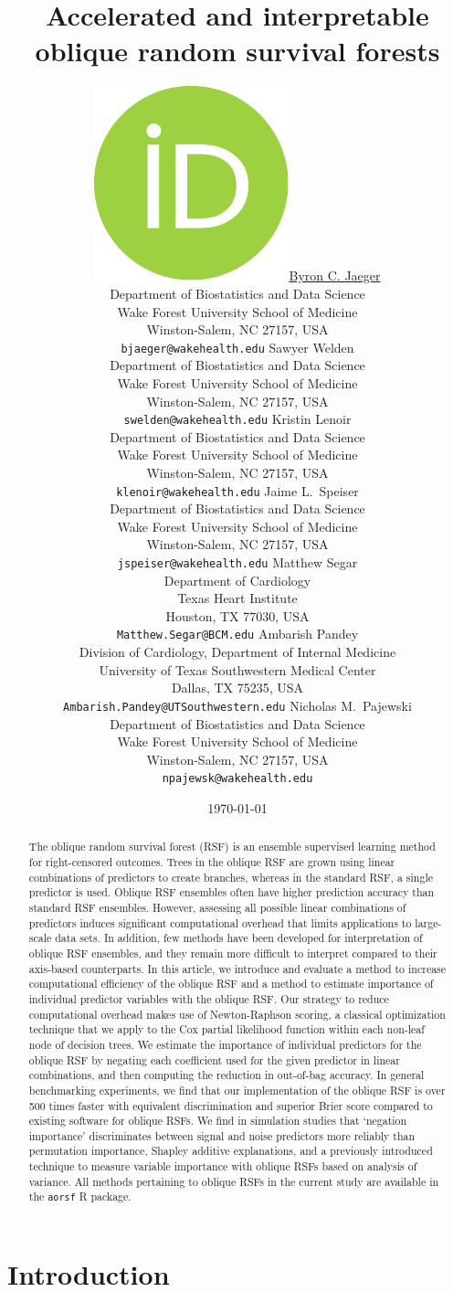 \documentclass{article}\usepackage[]{graphicx}\usepackage[]{xcolor}
\title{Accelerated and interpretable oblique random survival forests}
\date{\today}	%
\author{ \href{https://orcid.org/0000-0001-7399-2299}{\includegraphics[scale=0.06]{orcid.pdf}\hspace{1mm}Byron C. Jaeger} \\
	Department of Biostatistics and Data Science\\
	Wake Forest University School of Medicine\\
	Winston-Salem, NC 27157, USA \\
	\texttt{bjaeger@wakehealth.edu}
	\AND
   Sawyer Welden \\
   Department of Biostatistics and Data Science\\
   Wake Forest University School of Medicine\\
   Winston-Salem, NC 27157, USA \\
   \texttt{swelden@wakehealth.edu}
   \And
   Kristin Lenoir \\
   Department of Biostatistics and Data Science\\
   Wake Forest University School of Medicine\\
   Winston-Salem, NC 27157, USA \\
   \texttt{klenoir@wakehealth.edu}
	 \And
	 Jaime L.~Speiser \\
	 Department of Biostatistics and Data Science\\
	 Wake Forest University School of Medicine\\
	 Winston-Salem, NC 27157, USA \\
	 \texttt{jspeiser@wakehealth.edu}
	 \And
	 Matthew Segar \\
   Department of Cardiology \\
   Texas Heart Institute \\
   Houston, TX 77030, USA \\
	 \texttt{Matthew.Segar@BCM.edu}
   \And
	 Ambarish Pandey \\
   Division of Cardiology, Department of Internal Medicine \\
   University of Texas Southwestern Medical Center \\
   Dallas, TX 75235, USA \\
	 \texttt{Ambarish.Pandey@UTSouthwestern.edu}
	 \And
	 Nicholas M.~Pajewski \\
	 Department of Biostatistics and Data Science\\
	 Wake Forest University School of Medicine\\
	 Winston-Salem, NC 27157, USA \\
	 \texttt{npajewsk@wakehealth.edu}
}
\begin{document}
\maketitle




\begin{abstract}

	The oblique random survival forest (RSF) is an ensemble supervised learning method for right-censored outcomes. Trees in the oblique RSF are grown using linear combinations of predictors to create branches, whereas in the standard RSF, a single predictor is used. Oblique RSF ensembles often have higher prediction accuracy than standard RSF ensembles. However, assessing all possible linear combinations of predictors induces significant computational overhead that limits applications to large-scale data sets. In addition, few methods have been developed for interpretation of oblique RSF ensembles, and they remain more difficult to interpret compared to their axis-based counterparts. In this article, we introduce and evaluate a method to increase computational efficiency of the oblique RSF and a method to estimate importance of individual predictor variables with the oblique RSF. Our strategy to reduce computational overhead makes use of Newton-Raphson scoring, a classical optimization technique that we apply to the Cox partial likelihood function within each non-leaf node of decision trees. We estimate the importance of individual predictors for the oblique RSF by negating each coefficient used for the given predictor in linear combinations, and then computing the reduction in out-of-bag accuracy. In general benchmarking experiments, we find that our implementation of the oblique RSF is over 500 times faster with equivalent discrimination and superior Brier score compared to existing software for oblique RSFs. We find in simulation studies that `negation importance' discriminates between signal and noise predictors more reliably than permutation importance, Shapley additive explanations, and a previously introduced technique to measure variable importance with oblique RSFs based on analysis of variance. All methods pertaining to oblique RSFs in the current study are available in the \texttt{aorsf} R package.

\end{abstract}




\section{Introduction}
\end{document}
